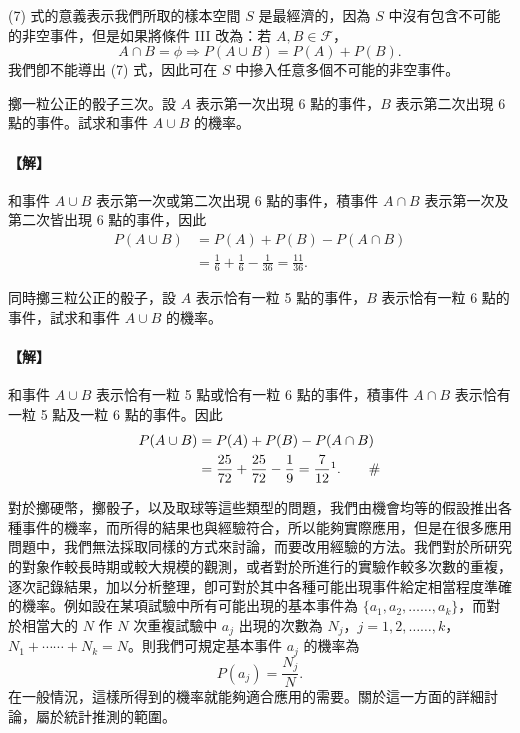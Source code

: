 (7) 式的意義表示我們所取的樣本空間 $S$ 是最經濟的，因為 $S$ 中沒有包含不可能的非空事件，但是如果將條件 III 改為：若 $A, B \in \mathscr{F}$，
\[
A \cap B = \phi \Longrightarrow P(A \cup B) = P(A) + P(B).
\]
我們卽不能導出 (7) 式，因此可在 $S$ 中摻入任意多個不可能的非空事件。

\medskip
\begin{example}\label{ex:b5-4-2}
擲一粒公正的骰子三次。設 $A$ 表示第一次出現 6 點的事件，$B$ 表示第二次出現 6 點的事件。試求和事件 $A \cup B$ 的機率。
\end{example}
\paragraph{【解】}
和事件 $A \cup B$ 表示第一次或第二次出現 6 點的事件，積事件 $A \cap B$ 表示第一次及第二次皆出現 6 點的事件，因此
\begin{align*}
P(A \cup B) &= P(A) + P(B) - P(A \cap B) \\
&= \frac{1}{6} + \frac{1}{6} - \frac{1}{36} = \frac{11}{36}. \tag*{\#}
\end{align*}

\medskip
\begin{example}\label{ex:b5-4-3}
同時擲三粒公正的骰子，設 $A$ 表示恰有一粒 5 點的事件，$B$ 表示恰有一粒 6 點的事件，試求和事件 $A \cup B$ 的機率。
\end{example}
\paragraph{【解】}
和事件 $A \cup B$ 表示恰有一粒 5 點或恰有一粒 6 點的事件，積事件 $A \cap B$ 表示恰有一粒 5 點及一粒 6 點的事件。因此
\label{note:b5-ch4-p121-calc}
\begin{align*}
P(A \cup B) &= P(A) + P(B) - P(A \cap B) \\
&= \frac{25}{72} + \frac{25}{72} - \frac{1}{9} = \frac{7}{12}\footnotemark. \tag*{\#}
\end{align*}

對於擲硬幣，擲骰子，以及取球等這些類型的問題，我們由機會均等的假設推出各種事件的機率，而所得的結果也與經驗符合，所以能夠實際應用，但是在很多應用問題中，我們無法採取同樣的方式來討論，而要改用經驗的方法。我們對於所研究的對象作較長時期或較大規模的觀測，或者對於所進行的實驗作較多次數的重複，逐次記錄結果，加以分析整理，卽可對於其中各種可能出現事件給定相當程度準確的機率。例如設在某項試驗中所有可能出現的基本事件為 $\{a_1, a_2, \dots\dots, a_k\}$，而對於相當大的 $N$ 作 $N$ 次重複試驗中 $a_j$ 出現的次數為 $N_j$，$j = 1, 2, \dots\dots, k$，$N_1 + \cdots\cdots + N_k = N$。則我們可規定基本事件 $a_j$ 的機率為
\[
P(a_j) = \frac{N_j}{N}.
\]
在一般情況，這樣所得到的機率就能夠適合應用的需要。關於這一方面的詳細討論，屬於統計推測的範圍。

